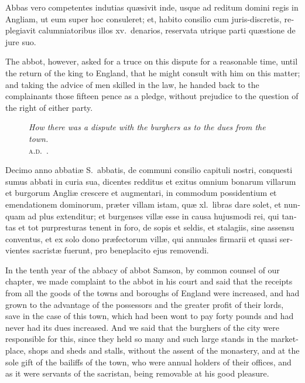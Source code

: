 \documentclass[10pt]{book}
\newcommand{\blockhead}[4][]{
\begin{figure}
\centering
\vspace{#4}
\parbox{2.75cm}{\begin{center}\footnotesize \color{BrickRed} \emph{#2}\\ #1 \end{center}}
\end{figure}
}
\begin{document}
\begin{paracol}{2}
\switchcolumn*

\begin{otherlanguage}{latin}
Abbas vero competentes indutias qu\ae{}sivit inde, usque ad reditum domini regis in Angliam, ut eum super hoc consuleret; et, habito consilio cum juris-discretis, replegiavit calumniatoribus illos xv.\ denarios, reservata utrique parti qu\ae{}stione de jure suo.
\end{otherlanguage}

\switchcolumn

The abbot, however, asked for a truce on this dispute for a reasonable time, until the return of the king to England, that he might consult with him on this matter; and taking the advice of men skilled in the law, he handed back to the complainants those fifteen pence as a pledge, without prejudice to the question of the right of either party.

\switchcolumn*

\begin{otherlanguage}{latin}
\blockhead[\textsc{a.d}.\ .]{How there was a dispute with the burghers as to the dues from the town.}{4}{-.65cm}
Decimo anno abbati\ae{} S.\ abbatis, de communi consilio capituli nostri, conquesti sumus abbati in curia sua, dicentes redditus et exitus omnium bonarum villarum et burgorum Angli\ae{} crescere et augmentari, in commodum possidentium et emendationem dominorum, pr\ae{}ter villam istam, qu\ae{} xl.\ libras dare solet, et nunquam ad plus extenditur; et burgenses vill\ae{} esse in causa hujusmodi rei, qui tantas et tot purpresturas tenent in foro, de sopis et seldis, et stalagiis, sine assensu conventus, et ex solo dono pr\ae{}fectorum vill\ae{}, qui annuales firmarii et quasi servientes sacrist\ae{} fuerunt, pro beneplacito ejus removendi. 

\end{otherlanguage}

\switchcolumn

In the tenth year of the abbacy of abbot Samson, by common counsel of our chapter, we made complaint to the abbot in his court and said that the receipts from all the goods of the towns and boroughs of England were increased, and had grown to the advantage of the possessors and the greater profit of their lords, save in the case of this town, which had been wont to pay forty pounds and had never had its dues increased. And we said that the burghers of the city were responsible for this, since they held so many and such large stands in the market-place, shops and sheds and stalls, without the assent of the monastery, and at the sole gift of the bailiffs of the town, who were annual holders of their offices, and as it were servants of the sacristan, being removable at his good pleasure.


\end{paracol}
\end{document}
